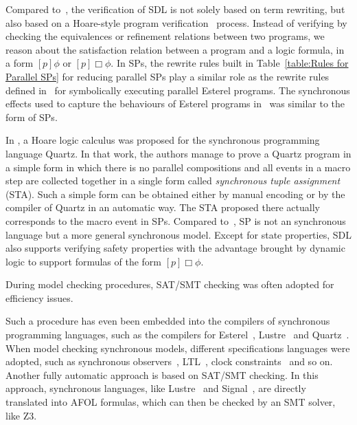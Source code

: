\documentclass{fcs}
\begin{document}
Compared to~\cite{Florence19,Song21}, the verification of SDL is not solely based on term rewriting, but also based on a Hoare-style program verification~\cite{ProgramVerifications09} process.
Instead of verifying by checking the equivalences or refinement relations between two programs,
we reason about the satisfaction relation between a program and a logic formula, in a form $[p]\phi$ or $[p]\Box\phi$.
In SPs, the rewrite rules built in Table~\ref{table:Rules for Parallel SPs} for reducing parallel SPs play a similar role as the rewrite rules defined in~\cite{Florence19,Song21} for symbolically executing parallel Esterel programs.
The synchronous effects used to capture the behaviours of Esterel programs in~\cite{Song21} was similar to the form of SPs.

In \cite{Gesell12}, a Hoare logic calculus was proposed for the synchronous programming language Quartz.
In that work, the authors manage to prove a Quartz program in a simple form in which there is no parallel compositions and all events in a macro step  are collected together in a single form called \emph{synchronous tuple assignment} (STA).
Such a simple form can be obtained either by manual encoding or by the compiler of Quartz in an automatic way.
The STA proposed there actually corresponds to the macro event in SPs.
Compared to~\cite{Gesell12}, SP is not an synchronous language but a more general synchronous model.
Except for state properties, SDL also supports verifying safety properties with the advantage brought by dynamic logic to support formulas of the form $[p]\Box\phi$.






\ifx
During model checking procedures, SAT/SMT checking was often adopted for efficiency issues.

Such a procedure has even been embedded into the compilers of synchronous programming languages, such as the compilers for Esterel~\cite{???}, Lustre~\cite{???} and Quartz~\cite{???}.
When model checking synchronous models, different specifications languages were adopted, such as synchronous observers~\cite{synchronous observers and the verification of reactive systems,From a synchronous declarative language to a temporal logic dealing with multiform time}, LTL~\cite{???}, clock constraints~\cite{???,???} and so on.
Another fully automatic approach is based on SAT/SMT checking.
In this approach, synchronous languages, like Lustre~\cite{???} and Signal~\cite{???}, are directly translated into AFOL formulas, which can then be checked by an SMT solver, like Z3.
\end{document}
